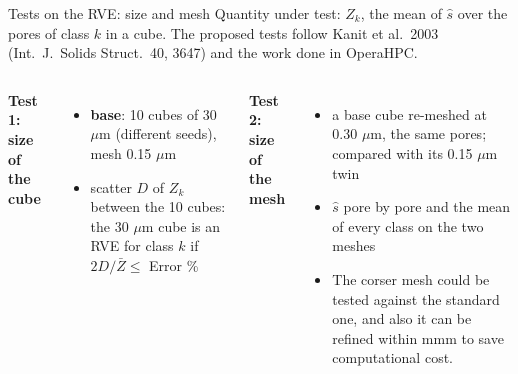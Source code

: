 \documentclass[10pt,aspectratio=169]{beamer}
\newcommand{\pp}[1]{{\color{paper}#1}}   %
\newcommand{\oo}[1]{{\color{own}#1}}     %
\begin{document}
\begin{frame}{Tests on the RVE: size and mesh}
\footnotesize
Quantity under test: $Z_k$, the mean of $\hat s$ over the pores of class $k$ in a cube.
The proposed tests follow \pp{Kanit et al.\ 2003} (Int.\ J.\ Solids Struct.\ 40, 3647) and the work done in OperaHPC. %
\vspace{4pt}

\begin{columns}[T]
\textbf{Test 1: size of the cube}
\begin{itemize}
\item \textbf{base}: 10 cubes of 30 $\mu$m (different seeds), mesh 0.15 $\mu$m
\item scatter $D$ of $Z_k$ between the 10 cubes: the
      30 $\mu$m cube is an RVE for class $k$ if $2D/\bar Z\le $ Error \% 
\end{itemize}
\textbf{Test 2: size of the mesh}
\begin{itemize}
\item a base cube re-meshed at 0.30 $\mu$m, the same pores; compared with its 0.15 $\mu$m twin
\item $\hat s$ pore by pore and the mean of every class on the two meshes
\item The corser mesh could be tested against the standard one, and also it can be refined within mmm to save computational cost. 
\end{itemize}
\end{columns}
\end{frame}
\end{document}
